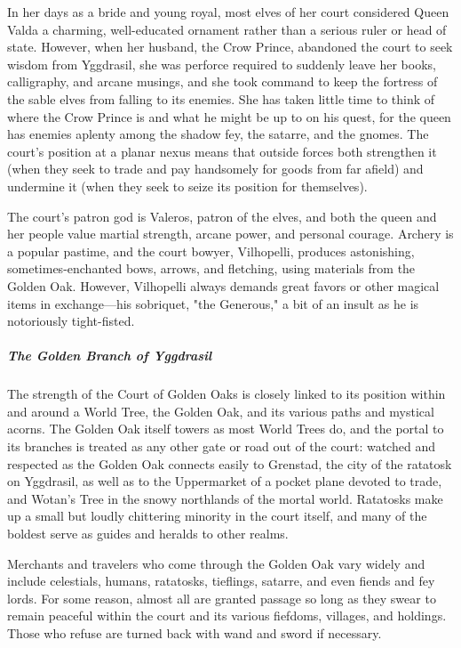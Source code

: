 \documentclass[10pt,a4paper,twoside,bg=print,twocolumn,openany,nodeprecatedcode]{dndbook}
\begin{document}
In her days as a bride and young royal, most elves of her court considered Queen Valda a charming, well-educated ornament rather than a serious ruler or head of state. However, when her husband, the Crow Prince, abandoned the court to seek wisdom from Yggdrasil, she was perforce required to suddenly leave her books, calligraphy, and arcane musings, and she took command to keep the fortress of the sable elves from falling to its enemies. She has taken little time to think of where the Crow Prince is and what he might be up to on his quest, for the queen has enemies aplenty among the shadow fey, the satarre, and the gnomes. The court's position at a planar nexus means that outside forces both strengthen it (when they seek to trade and pay handsomely for goods from far afield) and undermine it (when they seek to seize its position for themselves).

The court's patron god is Valeros, patron of the elves, and both the queen and her people value martial strength, arcane power, and personal courage. Archery is a popular pastime, and the court bowyer, Vilhopelli, produces astonishing, sometimes-enchanted bows, arrows, and fletching, using materials from the Golden Oak. However, Vilhopelli always demands great favors or other magical items in exchange—his sobriquet, "the Generous," a bit of an insult as he is notoriously tight-fisted.

\subparagraph{The Golden Branch of Yggdrasil}
The strength of the Court of Golden Oaks is closely linked to its position within and around a World Tree, the Golden Oak, and its various paths and mystical acorns. The Golden Oak itself towers as most World Trees do, and the portal to its branches is treated as any other gate or road out of the court: watched and respected as the Golden Oak connects easily to Grenstad, the city of the ratatosk on Yggdrasil, as well as to the Uppermarket of a pocket plane devoted to trade, and Wotan's Tree in the snowy northlands of the mortal world. Ratatosks make up a small but loudly chittering minority in the court itself, and many of the boldest serve as guides and heralds to other realms.

Merchants and travelers who come through the Golden Oak vary widely and include celestials, humans, ratatosks, tieflings, satarre, and even fiends and fey lords. For some reason, almost all are granted passage so long as they swear to remain peaceful within the court and its various fiefdoms, villages, and holdings. Those who refuse are turned back with wand and sword if necessary.
\end{document}
